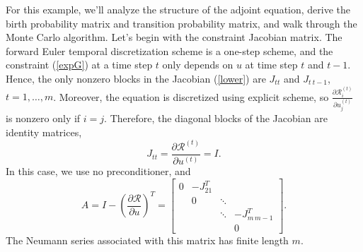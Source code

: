 \documentclass[a4paper,11pt]{article}
\theoremstyle{remark}
\theoremstyle{definition}
\begin{document}
    For this example, we'll analyze the structure of the adjoint
    equation, derive the birth probability matrix and transition
    probability matrix, and walk through the Monte Carlo algorithm.
    Let's begin with the constraint Jacobian matrix.  The
    forward Euler temporal discretization scheme is a one-step scheme,
    and the constraint (\ref{expG}) at a time step $t$ only depends on
    $u$ at time step $t$ and $t-1$.  Hence, the only nonzero blocks in
    the Jacobian (\ref{lower}) are $J_{t t}$ and $J_{t\: t-1}$,
    $t=1,\ldots,m$.  Moreover, the equation is discretized using explicit
    scheme, so $\frac{\partial \mathcal{R}_i^{(t)}}{\partial u_j^{(t)}}$ is
    nonzero only if $i=j$.  Therefore, the diagonal blocks of the
    Jacobian are identity matrices,
    $$ J_{t t} = \frac{\partial \mathcal{R}^{(t)}}{\partial u^{(t)}} = I. $$
    In this case, we use no preconditioner, and
    \[ A = I - \left( \frac{\partial \mathcal{R}}{\partial u} \right)^T =
    \begin{bmatrix}
    0        & -J_{2 1}^T &        & \\
             & 0          & \ddots & \\
             &            & \ddots & -J_{m\, m-1}^T \\
             &            &        & 0
    \end{bmatrix}. \]
    The Neumann series associated with this matrix has finite length $m$.
    
\end{document}
